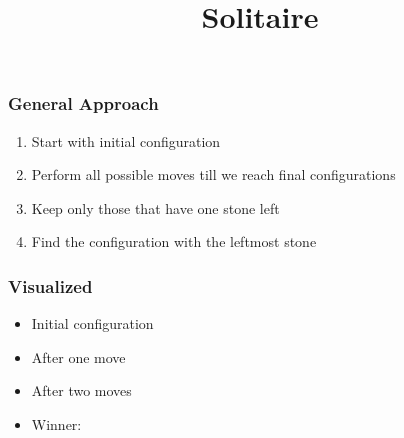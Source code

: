\documentclass{beamer}
\title{Solitaire}
\makeatletter
\newcommand{\configuration}[2]{
  \foreach[count=\i] \x in {#1} {
    \csname draw@\x\endcsname{($ #2 + (\i * 0.75,0)$)};
  }
}
\makeatother
\begin{document}
\begin{frame}
  \titlepage
\end{frame}

\begin{frame}
  \frametitle{General Approach}
  \begin{enumerate}
    \item Start with initial configuration
    \item Perform all possible moves till we reach final configurations
    \item Keep only those that have one stone left
    \item Find the configuration with the leftmost stone
  \end{enumerate}
\end{frame}

\begin{frame}
  \frametitle{Visualized}
  \begin{itemize}
    \item Initial configuration
      \begin{center}
      \end{center}
      \vskip5mm
    \item After one move
      \begin{center}
      \end{center}
      \vskip5mm
    \item After two moves
      \begin{center}
      \end{center}
      \vskip5mm
    \item Winner:
      \begin{center}
      \end{center}
  \end{itemize}
\end{frame}
\end{document}
